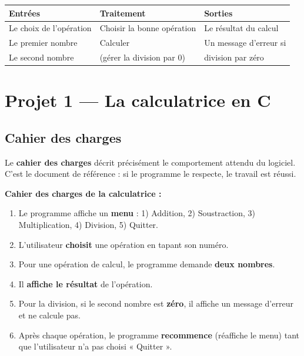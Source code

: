 \begin{center}\small
\begin{tabular}{@{}lll@{}}
\toprule
\textbf{Entrées} & \textbf{Traitement} & \textbf{Sorties}\\
\midrule
Le choix de l'opération & Choisir la bonne opération & Le résultat du calcul\\
Le premier nombre & Calculer & Un message d'erreur si\\
Le second nombre & (gérer la division par 0) & division par zéro\\
\bottomrule
\end{tabular}
\end{center}

\section{Projet 1 — La calculatrice en C}

\subsection{Cahier des charges}

\begin{definition}
Le \textbf{cahier des charges} décrit précisément le comportement attendu du
logiciel. C'est le document de référence : si le programme le respecte, le travail
est réussi.
\end{definition}

\noindent\textbf{Cahier des charges de la calculatrice :}
\begin{enumerate}[label=\arabic*)]
  \item Le programme affiche un \textbf{menu} : 1) Addition, 2) Soustraction,
        3) Multiplication, 4) Division, 5) Quitter.
  \item L'utilisateur \textbf{choisit} une opération en tapant son numéro.
  \item Pour une opération de calcul, le programme demande \textbf{deux nombres}.
  \item Il \textbf{affiche le résultat} de l'opération.
  \item Pour la division, si le second nombre est \textbf{zéro}, il affiche un
        message d'erreur et ne calcule pas.
  \item Après chaque opération, le programme \textbf{recommence} (réaffiche le
        menu) tant que l'utilisateur n'a pas choisi « Quitter ».
\end{enumerate}

